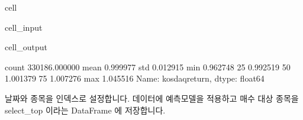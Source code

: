 \documentclass[letterpaper,10pt,english]{jupyterBook}
\begin{document}
\begin{sphinxuseclass}{cell}\begin{sphinxVerbatimInput}

\begin{sphinxuseclass}{cell_input}
\begin{sphinxVerbatim}[commandchars=\\\{\}]
\PYG{p}{[}\PYG{p}{]}
\end{sphinxVerbatim}

\end{sphinxuseclass}\end{sphinxVerbatimInput}
\begin{sphinxVerbatimOutput}

\begin{sphinxuseclass}{cell_output}
\begin{sphinxVerbatim}[commandchars=\\\{\}]
count    330186.000000
mean          0.999977
std           0.012915
min           0.962748
25\PYGZpc{}           0.992519
50\PYGZpc{}           1.001379
75\PYGZpc{}           1.007276
max           1.045516
Name: kosdaq\PYGZus{}return, dtype: float64
\end{sphinxVerbatim}

\end{sphinxuseclass}\end{sphinxVerbatimOutput}

\end{sphinxuseclass}
\sphinxAtStartPar
 날짜와 종목을 인덱스로 설정합니다. 데이터에 예측모델을 적용하고 매수 대상 종목을 select\_top 이라는 DataFrame 에 저장합니다.
\end{document}
